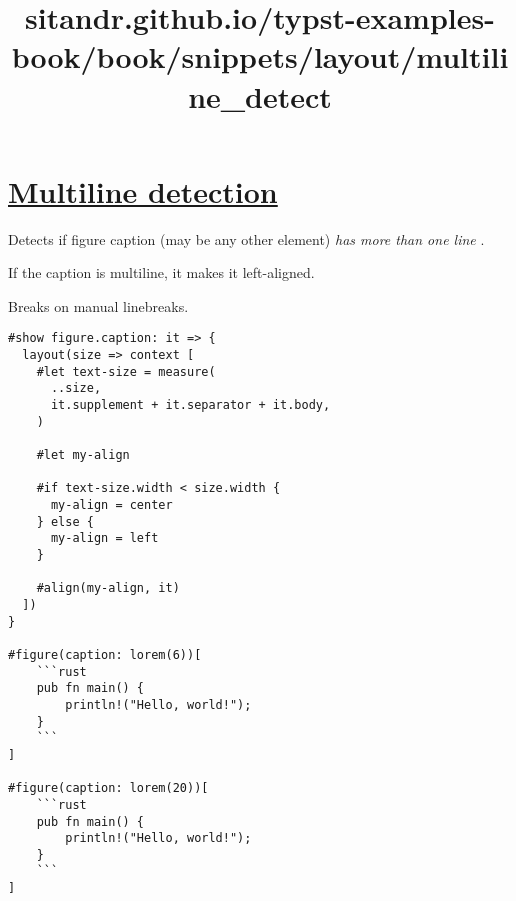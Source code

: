 \title{sitandr.github.io/typst-examples-book/book/snippets/layout/multiline_detect}

\section{\texorpdfstring{\hyperref[multiline-detection]{Multiline
detection}}{Multiline detection}}\label{multiline-detection}

Detects if figure caption (may be any other element) \emph{has more than
one line} .

If the caption is multiline, it makes it left-aligned.

Breaks on manual linebreaks.

\begin{verbatim}
#show figure.caption: it => {
  layout(size => context [
    #let text-size = measure(
      ..size,
      it.supplement + it.separator + it.body,
    )

    #let my-align

    #if text-size.width < size.width {
      my-align = center
    } else {
      my-align = left
    }

    #align(my-align, it)
  ])
}

#figure(caption: lorem(6))[
    ```rust
    pub fn main() {
        println!("Hello, world!");
    }
    ```
]

#figure(caption: lorem(20))[
    ```rust
    pub fn main() {
        println!("Hello, world!");
    }
    ```
]
\end{verbatim}

\pandocbounded{}
